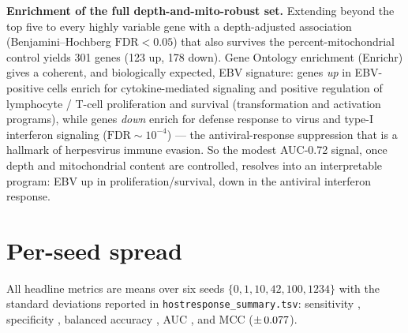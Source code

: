 \documentclass[11pt]{article}
\begin{document}
\textbf{Enrichment of the full depth-and-mito-robust set.} Extending beyond the top five
to every highly variable gene with a depth-adjusted association (Benjamini--Hochberg
$\textrm{FDR}<0.05$) that also survives the percent-mitochondrial control yields 301
genes (123 up, 178 down). Gene Ontology enrichment (Enrichr) gives a coherent, and
biologically expected, EBV signature: genes \emph{up} in EBV-positive cells enrich for
cytokine-mediated signaling and positive regulation of lymphocyte / T-cell
proliferation and survival (transformation and activation programs), while genes
\emph{down} enrich for defense response to virus and type-I interferon signaling
($\textrm{FDR}\sim10^{-4}$) --- the antiviral-response suppression that is a hallmark of
herpesvirus immune evasion. So the modest AUC-0.72 signal, once depth and
mitochondrial content are controlled, resolves into an interpretable program: EBV up
in proliferation/survival, down in the antiviral interferon response.

\section{Per-seed spread}
All headline metrics are means over six seeds $\{0,1,10,42,100,1234\}$ with the
standard deviations reported in \texttt{hostresponse\_summary.tsv}: sensitivity
, specificity ,
balanced accuracy , AUC ,
and MCC  ($\pm\,0.077$).
\end{document}
